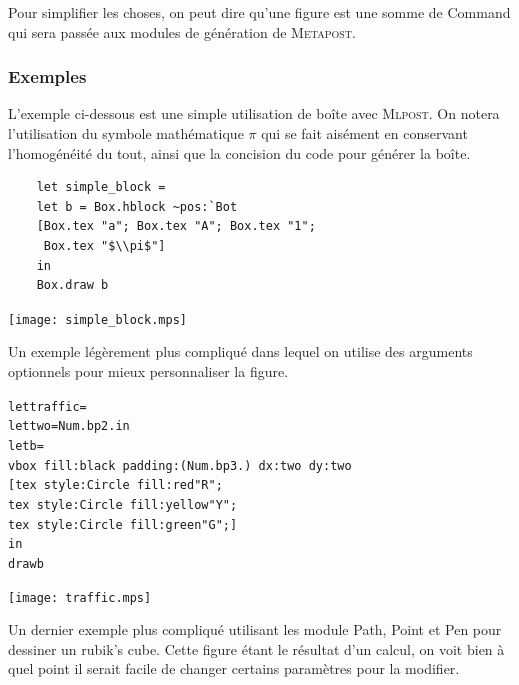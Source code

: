 \documentclass[a4paper,12pt]{article}
\newcommand{\mlpost}{\textsc{Mlpost}}
\newcommand{\meta}{\textsc{Metapost}}
\begin{document}
Pour simplifier les choses, on peut dire qu'une figure est une somme de Command qui sera passée aux modules de génération de \meta.


\subsubsection{Exemples}
L'exemple ci-dessous est une simple utilisation de boîte avec \mlpost. On notera l'utilisation du symbole mathématique $\pi$ qui se fait aisément en conservant l'homogénéité du tout, ainsi que la concision du code pour générer la boîte.
\bigskip 

\begin{minipage}{0.7\linewidth}
  \begin{verbatim}
    let simple_block =
    let b = Box.hblock ~pos:`Bot 
    [Box.tex "a"; Box.tex "A"; Box.tex "1"; 
     Box.tex "$\\pi$"] 
    in
    Box.draw b
  \end{verbatim}
\end{minipage}
\begin{minipage}{0.3\linewidth}
  \begin{center}
    \texttt{[image: simple\_block.mps]}
  \end{center}
\end{minipage}


Un exemple légèrement plus compliqué dans lequel on utilise des arguments optionnels pour mieux personnaliser la figure.
\bigskip 

\begin{minipage}{0.7\linewidth}
  \begin{alltt}
    let traffic =
    let two = Num.bp 2. in
    let b = 
    vbox ~fill:black ~padding:(Num.bp 3.) ~dx:two ~dy:two
    [ tex ~style:Circle ~fill:red "R";
      tex ~style:Circle ~fill:yellow "Y";
      tex ~style:Circle ~fill:green "G"; ]
    in
    draw b
  \end{alltt}
\end{minipage}
\begin{minipage}{0.3\linewidth}
  \begin{center}
    \texttt{[image: traffic.mps]}
  \end{center}
\end{minipage}

Un dernier exemple plus compliqué utilisant les module Path, Point et Pen pour dessiner un rubik's cube. Cette figure étant le résultat d'un calcul, on voit bien à quel point il serait facile de changer certains paramètres pour la modifier.
\bigskip 
\end{document}
